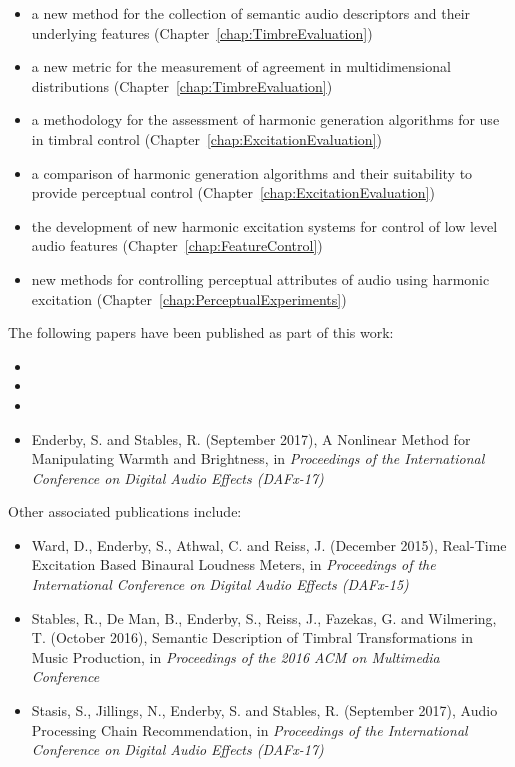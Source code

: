 	\begin{itemize}
		\item a new method for the collection of semantic audio descriptors and their underlying features
		      (Chapter~\ref{chap:TimbreEvaluation})
		\item a new metric for the measurement of agreement in multidimensional distributions
		      (Chapter~\ref{chap:TimbreEvaluation})
		\item a methodology for the assessment of harmonic generation algorithms for use in timbral control
		      (Chapter~\ref{chap:ExcitationEvaluation})
		\item a comparison of harmonic generation algorithms and their suitability to provide perceptual control
		      (Chapter~\ref{chap:ExcitationEvaluation})
		\item the development of new harmonic excitation systems for control of low level audio features
		      (Chapter~\ref{chap:FeatureControl})
		\item new methods for controlling perceptual attributes of audio using harmonic excitation
		      (Chapter~\ref{chap:PerceptualExperiments})
	\end{itemize}

	The following papers have been published as part of this work:

	\begin{itemize}
		\item {}
		\item {}
		\item {}
		\item Enderby, S. and Stables, R. (September 2017), A Nonlinear Method for Manipulating Warmth and
		      Brightness, in \emph{Proceedings of the International Conference on Digital Audio Effects (DAFx-17)}
	\end{itemize}

	Other associated publications include:

	\begin{itemize}
		\item Ward, D., Enderby, S., Athwal, C. and Reiss, J. (December 2015), Real-Time Excitation Based Binaural
		      Loudness Meters, in \emph{Proceedings of the International Conference on Digital Audio Effects
		      (DAFx-15)}
		\item Stables, R., De Man, B., Enderby, S., Reiss, J., Fazekas, G. and Wilmering, T. (October 2016),
		      Semantic Description of Timbral Transformations in Music Production, in \emph{Proceedings of the
		      2016 ACM on Multimedia Conference}
		\item Stasis, S., Jillings, N., Enderby, S. and Stables, R. (September 2017), Audio Processing Chain
		      Recommendation, in \emph{Proceedings of the International Conference on Digital Audio Effects
		      (DAFx-17)}
	\end{itemize}
